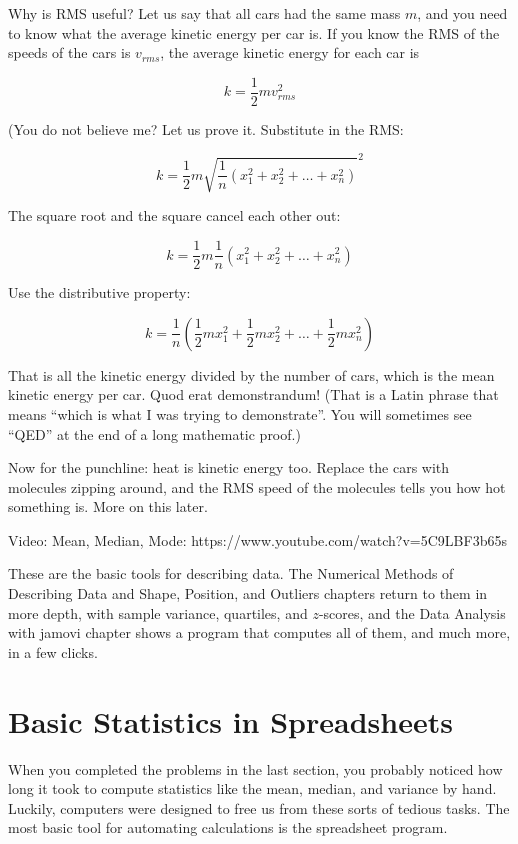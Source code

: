 Why is RMS useful? Let us say that all cars had the same mass $m$, and
you need to know what the average kinetic energy per car is. If you
know the RMS of the speeds of the cars is $v_{rms}$, the average kinetic energy for
each car is

$$k = \frac{1}{2}m v_{rms}^2$$

(You do not believe me? Let us prove it. Substitute in the RMS:

$$k = \frac{1}{2}m \sqrt{\frac{1}{n}\left( x_1^2 + x_2^2 + \ldots + x_n^2 \right)}^2$$

The square root and the square cancel each other out:

$$k = \frac{1}{2}m \frac{1}{n}\left( x_1^2 + x_2^2 + \ldots + x_n^2 \right)$$

Use the distributive property:

$$k = \frac{1}{n} \left( \frac{1}{2} m x_1^2 + \frac{1}{2}m x_2^2 + \ldots + \frac{1}{2}m x_n^2 \right)$$


That is all the kinetic energy divided by the number of cars, which is
the mean kinetic energy per car. Quod erat demonstrandum! (That is a
Latin phrase that means ``which is what I was trying to
demonstrate''. You will sometimes see ``QED'' at the end of a long
mathematic proof.)

Now for the punchline: heat is kinetic energy too. Replace the cars with molecules zipping around, and the RMS speed of the molecules tells you how hot something is. More on this later.

Video: Mean, Median, Mode: https://www.youtube.com/watch?v=5C9LBF3b65s


These are the basic tools for describing data. The Numerical Methods of Describing Data and Shape, Position, and
Outliers chapters return to them in more depth, with sample variance, quartiles, and $z$-scores, and the Data Analysis with jamovi
chapter shows a program that computes all of them, and much more, in a few clicks.

\section{Basic Statistics in Spreadsheets}
When you completed the problems in the last section, you probably noticed
how long it took to compute statistics like the mean, median,
and variance by hand. Luckily, computers were designed to free us from these
sorts of tedious tasks. The most basic tool for automating
calculations is the spreadsheet program.

